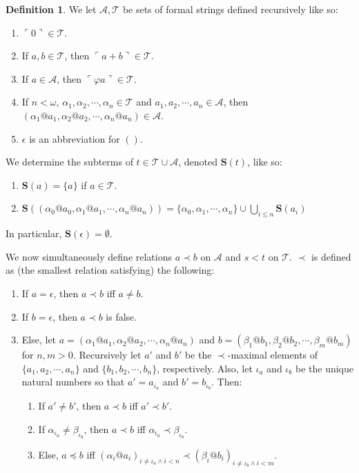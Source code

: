 \documentclass{article}
\theoremstyle{definition}
\newtheorem{definition}{Definition}[section]
\theoremstyle{plain}
\theoremstyle{plain}
\theoremstyle{plain}
\theoremstyle{plain}
\theoremstyle{remark}
\theoremstyle{remark}
\theoremstyle{remark}
\theoremstyle{plain}
\theoremstyle{plain}
\begin{document}
\begin{definition}
We let $\mathcal{A}, \mathcal{T}$ be sets of formal strings defined recursively like so:

\begin{enumerate}
    \item $\ulcorner 0 \urcorner \in \mathcal{T}$.
    \item If $a, b \in \mathcal{T}$, then $\ulcorner a + b \urcorner \in \mathcal{T}$.
    \item If $a \in \mathcal{A}$, then $\ulcorner \varphi a \urcorner \in \mathcal{T}$.
    \item If $n < \omega$, $\alpha_1, \alpha_2, \cdots, \alpha_n \in \mathcal{T}$ and $a_1, a_2, \cdots, a_n \in \mathcal{A}$, then $(\alpha_1 @ a_1, \alpha_2 @ a_2, \cdots, \alpha_n @ a_n) \in \mathcal{A}$.
    \item $\epsilon$ is an abbreviation for $()$.
\end{enumerate}

We determine the subterms of $t \in \mathcal{T} \cup \mathcal{A}$, denoted $\mathbf{S}(t)$, like so:

\begin{enumerate}
    \item $\mathbf{S}(a) = \{a\}$ if $a \in \mathcal{T}$.
    \item $\mathbf{S}((\alpha_0 @ a_0, \alpha_1 @ a_1, \cdots, \alpha_n @ a_n)) = \{\alpha_0, \alpha_1, \cdots, \alpha_n\} \cup \bigcup_{i \leq n} \mathbf{S}(a_i)$
\end{enumerate}

In particular, $\mathbf{S}(\epsilon) = \emptyset$.

We now simultaneously define relations $a \prec b$ on $\mathcal{A}$ and $s < t$ on $\mathcal{T}$. $\prec$ is defined as (the smallest relation satisfying) the following:

\begin{enumerate}
    \item If $a = \epsilon$, then $a \prec b$ iff $a \neq b$.
    \item If $b = \epsilon$, then $a \prec b$ is false.
    \item Else, let $a = (\alpha_1 @ a_1, \alpha_2 @ a_2, \cdots, \alpha_n @ a_n)$ and $b = (\beta_1 @ b_1, \beta_2 @ b_2, \cdots, \beta_m @ b_m)$ for $n, m > 0$. Recursively let $a'$ and $b'$ be the $\prec$-maximal elements of $\{a_1, a_2, \cdots, a_n\}$ and $\{b_1, b_2, \cdots, b_n\}$, respectively. Also, let $\iota_a$ and $\iota_b$ be the unique natural numbers so that $a' = a_{\iota_a}$ and $b' = b_{\iota_b}$. Then:
    \begin{enumerate}
        \item If $a' \neq b'$, then $a \prec b$ iff $a' \prec b'$.
        \item If $\alpha_{\iota_a} \neq \beta_{\iota_b}$, then $a \prec b$ iff $\alpha_{\iota_a} \prec \beta_{\iota_b}$.
        \item Else, $a \preceq b$ iff $(\alpha_i@a_i)_{i \neq \iota_a \land i < n} \prec (\beta_i@b_i)_{i \neq \iota_b \land i < m}$.
    \end{enumerate}
\end{enumerate}


\end{definition}
\end{document}
